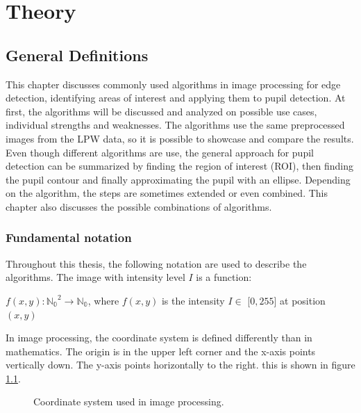 \chapter{Theory}
\section{General Definitions}
This chapter discusses commonly used algorithms in image processing for edge detection, identifying areas of interest and applying them to pupil detection. At first, the algorithms will be discussed and analyzed on possible use cases, individual strengths and weaknesses. The algorithms use the same preprocessed images from the LPW data, so it is possible to showcase and compare the results. Even though different algorithms are use, the general approach for pupil detection can be summarized by finding the region of interest (ROI), then finding the pupil contour and finally approximating the pupil with an ellipse. Depending on the algorithm, the steps are sometimes extended or even combined. This chapter also discusses the possible combinations of algorithms. 

\subsection{Fundamental notation}\label{subsec:funda}
Throughout this thesis, the following notation are used to describe the algorithms.
The image with intensity level $I$ is a function:

$f(x,y): \mathbb{\mathbb{N_0} }^2 \rightarrow \mathbb{\mathbb{N_0}}$, where $f(x,y)$ is the intensity $I \in $ [$0,255$] at position $(x,y)$

In image processing, the coordinate system is defined differently than in mathematics. The origin is in the upper left corner and the x-axis points vertically down. The y-axis points horizontally to the right. this is shown in figure \ref{fig:coordsystem}.

\begin{figure}[h]
    \centering


    \caption{Coordinate system used in image processing.}
    \label{fig:coordsystem}
\end{figure}


